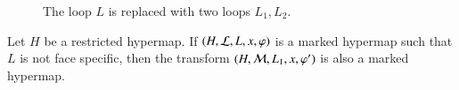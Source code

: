 \begin{figure}[htb]
\centering
{}
\caption{The loop $L$ is replaced with two loops $L_1, L_2$.}
\label{fig:L1L2}
\end{figure}





\begin{lemma}[transform] 
Let $H$ be a restricted hypermap.
If $(H,{\cal L},L,x,\varphi)$ is a marked hypermap such that $L$
is not face specific,  then the transform
$(H,{\cal M},L_1,x,\varphi')$ 
is also a marked hypermap.
\end{lemma}

